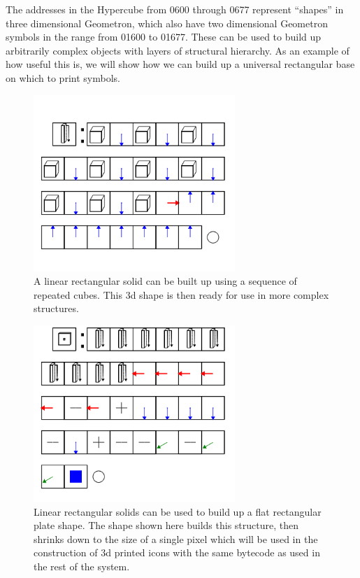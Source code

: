 The addresses in the Hypercube from 0600 through 0677 represent ``shapes'' in three dimensional Geometron, which also have two dimensional Geometron symbols in the range from 01600 to 01677.  These can be used to build up arbitrarily complex objects with layers of structural hierarchy.  As an example of how useful this is, we will show how we can build up a universal rectangular base on which to print symbols.  


\begin{figure}
	\centering
	\includegraphics[width=3in]{figures/geometron3d/shapebuilding1.png}
	\caption[shapebuilding1]
	{A linear rectangular solid can be built up using a sequence of repeated cubes.  This 3d shape is then ready for use in more complex structures.}
\end{figure}

\begin{figure}
	\centering
	\includegraphics[width=3in]{figures/geometron3d/shapebuilding2.png}
	\caption[shapebuilding2]
	{Linear rectangular solids can be used to build up a flat rectangular plate shape.  The shape shown here builds this structure, then shrinks down to the size of a single pixel which will be used in the construction of 3d printed icons with the same bytecode as used in the rest of the system.}
\end{figure}


